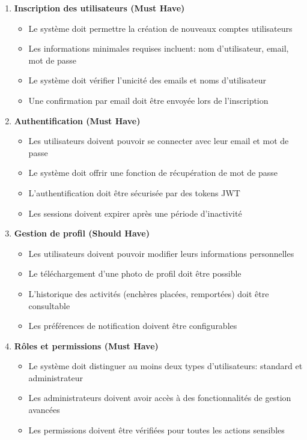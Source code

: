 \begin{enumerate}
    \item \textbf{Inscription des utilisateurs (Must Have)}
    \begin{itemize}
        \item Le système doit permettre la création de nouveaux comptes utilisateurs
        \item Les informations minimales requises incluent: nom d'utilisateur, email, mot de passe
        \item Le système doit vérifier l'unicité des emails et noms d'utilisateur
        \item Une confirmation par email doit être envoyée lors de l'inscription
    \end{itemize}
    
    \item \textbf{Authentification (Must Have)}
    \begin{itemize}
        \item Les utilisateurs doivent pouvoir se connecter avec leur email et mot de passe
        \item Le système doit offrir une fonction de récupération de mot de passe
        \item L'authentification doit être sécurisée par des tokens JWT
        \item Les sessions doivent expirer après une période d'inactivité
    \end{itemize}
    
    \item \textbf{Gestion de profil (Should Have)}
    \begin{itemize}
        \item Les utilisateurs doivent pouvoir modifier leurs informations personnelles
        \item Le téléchargement d'une photo de profil doit être possible
        \item L'historique des activités (enchères placées, remportées) doit être consultable
        \item Les préférences de notification doivent être configurables
    \end{itemize}
    
    \item \textbf{Rôles et permissions (Must Have)}
    \begin{itemize}
        \item Le système doit distinguer au moins deux types d'utilisateurs: standard et administrateur
        \item Les administrateurs doivent avoir accès à des fonctionnalités de gestion avancées
        \item Les permissions doivent être vérifiées pour toutes les actions sensibles
    \end{itemize}
\end{enumerate}

